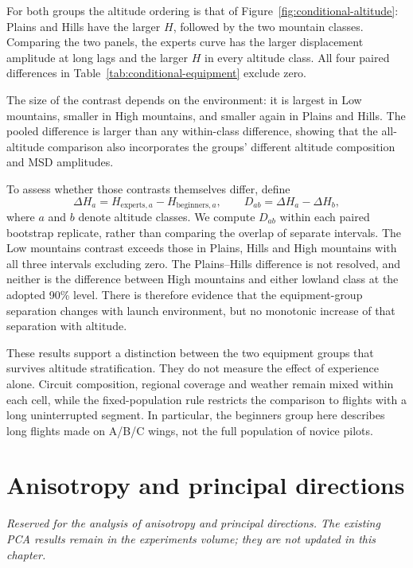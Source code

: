 For both groups the altitude ordering is that of
Figure~\ref{fig:conditional-altitude}: Plains and Hills have the larger $H$,
followed by the two mountain classes. Comparing the two panels, the experts curve
has the larger displacement amplitude at long lags and the larger $H$ in every
altitude class. All four paired differences in
Table~\ref{tab:conditional-equipment} exclude zero.

The size of the contrast depends on the environment: it is largest in Low mountains, smaller in
High mountains, and smaller again in Plains and Hills. The pooled difference is
larger than any within-class difference, showing that the all-altitude comparison
also incorporates the groups' different altitude composition and MSD amplitudes.

\begin{table}[htbp]
 \centering\small
 
 \caption{Experts-minus-beginners contrasts in the effective exponent, first
 pooling all altitudes and then within each class. The same bootstrap draws
 provide every contrast.}
 \label{tab:conditional-equipment}
\end{table}

To assess whether those contrasts themselves differ, define
\begin{equation}
 \Delta H_a=H_{\mathrm{experts},a}-H_{\mathrm{beginners},a},
 \qquad D_{ab}=\Delta H_a-\Delta H_b,
 \label{eq:conditional-interaction}
\end{equation}
where $a$ and $b$ denote altitude classes. We compute $D_{ab}$ within each paired
bootstrap replicate, rather than comparing the overlap of separate intervals.
The Low mountains contrast exceeds those in Plains, Hills and High mountains
with all three intervals excluding zero. The Plains--Hills difference is not
resolved, and neither is the difference between High mountains and either
lowland class at the adopted 90\% level. There is therefore evidence that the
equipment-group separation changes with launch environment, but no monotonic
increase of that separation with altitude.

These results support a distinction between the two equipment groups that survives
altitude stratification. They do not measure the effect of experience alone.
Circuit composition, regional coverage and weather remain mixed within each cell,
while the fixed-population rule restricts the comparison to flights with a long
uninterrupted segment. In particular, the beginners group here describes long
flights made on A/B/C wings, not the full population of novice pilots.
\FloatBarrier

\section{Anisotropy and principal directions}
\label{sec:fixed-anisotropy}
\emph{Reserved for the analysis of anisotropy and principal directions. The existing
PCA results remain in the experiments volume; they are not updated in this chapter.}
